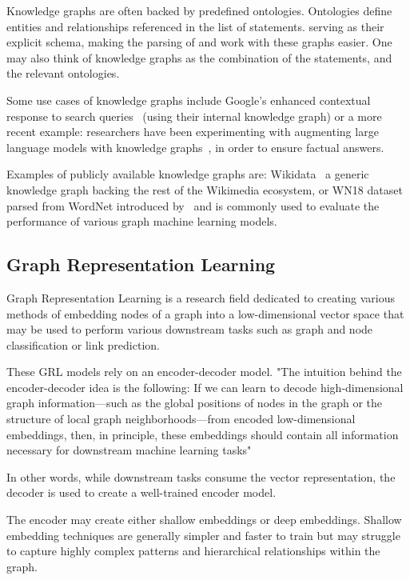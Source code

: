 Knowledge graphs are often backed by predefined ontologies.
Ontologies define entities and relationships referenced in the list of statements.
serving as their explicit schema, making the parsing of and
work with these graphs easier.
One may also think of knowledge graphs as the combination of the statements, and the relevant ontologies.

Some use cases of knowledge graphs include Google's enhanced contextual response to search queries~\cite{GoogleKnowledgeGraph} (using their internal
knowledge graph) or a more recent example: researchers have been experimenting with augmenting large language models
with knowledge graphs~\cite{LLMKG}, in order to ensure factual answers.

Examples of publicly available knowledge graphs are: Wikidata~\cite{Wikidata} a generic
knowledge graph backing the rest of the Wikimedia ecosystem, or WN18 dataset parsed from WordNet
introduced by~\cite{TransE} and is commonly used to evaluate the performance of various graph machine learning models.



\FloatBarrier
\subsection{Graph Representation Learning}\label{subsec:introduction-graph-representation-learning}
Graph Representation Learning is a research field dedicated to creating various methods of embedding nodes of a graph into
a low-dimensional vector space that may be used to perform various downstream tasks such as graph and node classification or link prediction.

These GRL models rely on an encoder-decoder model.
"The intuition behind the encoder-decoder idea is the following:
If we can learn to decode high-dimensional graph information—such as the global positions of
nodes in the graph or the structure of local graph neighborhoods—from encoded low-dimensional embeddings, then, in principle,
these embeddings should contain all information necessary for downstream machine learning tasks"~\cite{RLGMandA}

In other words, while downstream tasks consume the vector representation, the decoder is used to create a well-trained encoder model.

The encoder may create either shallow embeddings or deep embeddings.
Shallow embedding techniques are generally simpler and faster to train but
may struggle to capture highly complex patterns and hierarchical relationships within the graph.


